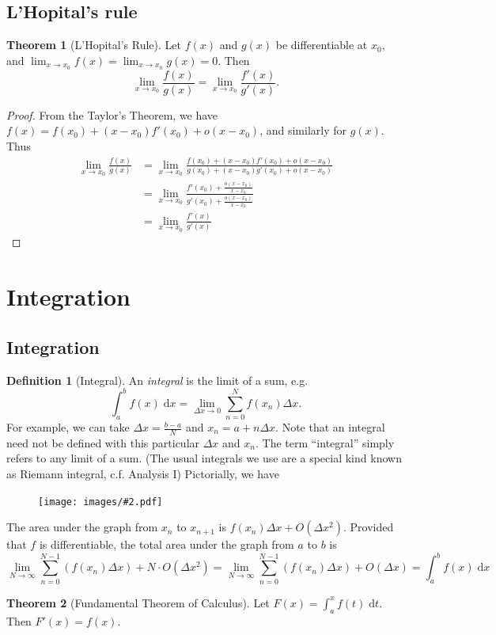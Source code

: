 \documentclass[a4paper]{article}
\theoremstyle{definition}
\newtheorem*{thm}{Theorem}
\newtheorem*{defi}{Definition}
\renewcommand{\d}{\mathrm{d}}
\let\stdsection\section
\renewcommand\section{\newpage\stdsection}
\newcommand{\img}[2][]{\begin{figure}[ht]\centering\texttt{[image: images/\#2.pdf]}\end{figure}}
\begin{document}
\subsection{L'Hopital's rule}
\begin{thm}[L'Hopital's Rule]
  Let $f(x)$ and $g(x)$ be differentiable at $x_0$, and $\displaystyle \lim_{x\to x_0}f(x) = \lim_{x\to x_0}g(x) = 0$. Then
  \[
  \lim_{x\to x_0} \frac{f(x)}{g(x)} = \lim_{x\to x_0} \frac{f'(x)}{g'(x)}.
  \]
\end{thm}
\begin{proof}
  From the Taylor's Theorem, we have $f(x) = f(x_0) + (x - x_0)f'(x_0) + o(x - x_0)$, and similarly for $g(x)$. Thus
  \begin{align*}
    \lim_{x\to x_0} \frac{f(x)}{g(x)} &= \lim_{x\to x_0} \frac{f(x_0) + (x - x_0)f'(x_0) + o(x - x_0)}{g(x_0) + (x - x_0)g'(x_0) + o(x - x_0)}\\
    &= \lim_{x\to x_0} \frac{f'(x_0) + \frac{o(x-x_0)}{x-x_0}}{g'(x_0) + \frac{o(x-x_0)}{x-x_0}}\\
    &= \lim_{x\to x_0} \frac{f'(x)}{g'(x)}
  \end{align*}
\end{proof}

\section{Integration}
\subsection{Integration}
\begin{defi}[Integral]
  An \emph{integral} is the limit of a sum, e.g. 
  \[
  \int_a^b f(x) \;\d x = \lim_{\Delta x\to 0}\sum_{n=0}^N f(x_n)\Delta x.
  \]
  For example, we can take $\Delta x=\frac{b - a}{N}$ and $x_n = a + n\Delta x$. Note that an integral need not be defined with this particular $\Delta x$ and $x_n$. The term ``integral'' simply refers to any limit of a sum. (The usual integrals we use are a special kind known as Riemann integral, c.f. Analysis I) Pictorially, we have
  \img{de_1}
\end{defi}

The area under the graph from $x_n$ to $x_{n+1}$ is $f(x_n)\Delta x + O(\Delta x^2)$. Provided that $f$ is differentiable, the total area under the graph from $a$ to $b$ is
\[
\lim_{N\to \infty} \sum_{n=0}^{N-1}(f(x_n)\Delta x) + N\cdot O(\Delta x^2) = \lim_{N\to \infty} \sum_{n=0}^{N-1}(f(x_n)\Delta x) + O(\Delta x) = \int_a^b f(x)\;\d x
\]
\begin{thm}[Fundamental Theorem of Calculus]
  Let $F(x) = \int_a^x f(t)\;\d t$. Then $F'(x) = f(x)$.
\end{thm}
\end{document}
